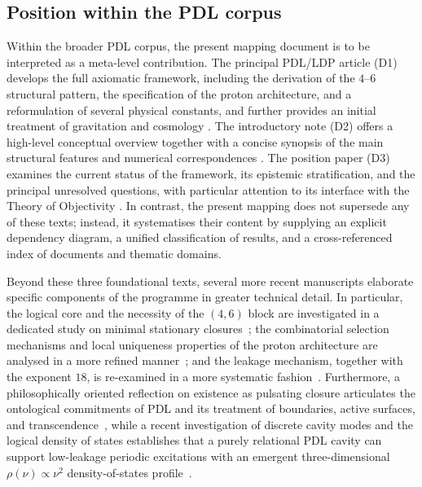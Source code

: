 \documentclass[11pt,a4paper]{article}
\begin{document}
\subsection{Position within the PDL corpus}
\label{subsec:position_corpus}

Within the broader PDL corpus, the present mapping document is to be interpreted as a meta-level contribution. The principal PDL/LDP article (D1) develops the full axiomatic framework, including the derivation of the $4$–$6$ structural pattern, the specification of the proton architecture, and a reformulation of several physical constants, and further provides an initial treatment of gravitation and cosmology \citep{PDL_Main_2026}. The introductory note (D2) offers a high-level conceptual overview together with a concise synopsis of the main structural features and numerical correspondences \citep{PDL_intro}. The position paper (D3) examines the current status of the framework, its epistemic stratification, and the principal unresolved questions, with particular attention to its interface with the Theory of Objectivity \citep{PDL_position}. In contrast, the present mapping does not supersede any of these texts; instead, it systematises their content by supplying an explicit dependency diagram, a unified classification of results, and a cross-referenced index of documents and thematic domains.

Beyond these three foundational texts, several more recent manuscripts elaborate specific components of the programme in greater technical detail. In particular, the logical core and the necessity of the $(4,6)$ block are investigated in a dedicated study on minimal stationary closures~\citep{Minimal_Stationary_Closures_2026}; the combinatorial selection mechanisms and local uniqueness properties of the proton architecture are analysed in a more refined manner~\citep{Proton_Local_Uniqueness_2026,Combinatorial_Proton_v2_2026}; and the leakage mechanism, together with the exponent $18$, is re-examined in a more systematic fashion~\citep{Coherence_Leakage_18_2026,Exponent_18_PDL_2026}. Furthermore, a philosophically oriented reflection on existence as pulsating closure articulates the ontological commitments of PDL and its treatment of boundaries, active surfaces, and transcendence~\citep{ExistencePulsatingClosure2026}, while a recent investigation of discrete cavity modes and the logical density of states establishes that a purely relational PDL cavity can support low-leakage periodic excitations with an emergent three-dimensional $\rho(\nu)\propto \nu^2$ density-of-states profile~\citep{PDLCavityModes2026}. 
\end{document}
